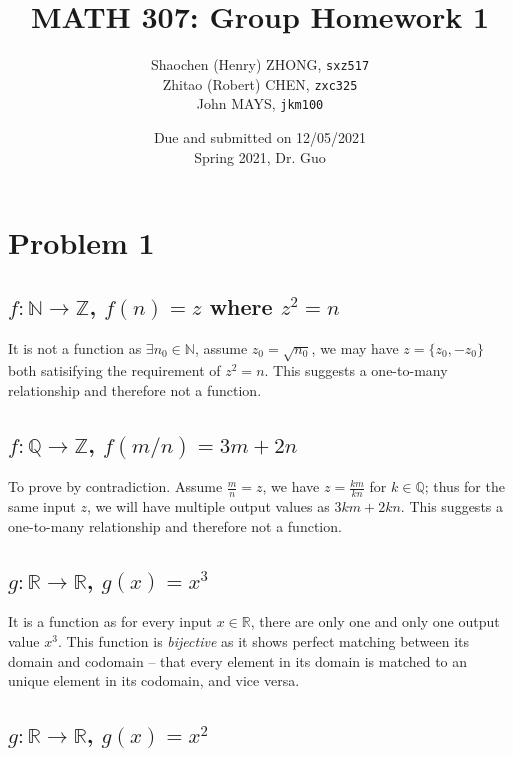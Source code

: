 \documentclass[11pt]{article}
\newcommand{\ilc}{\texttt}
\begin{document}
\title{\textbf{MATH 307: Group Homework 1}}


\author{Shaochen (Henry) ZHONG, \ilc{sxz517} \\
Zhitao (Robert) CHEN, \ilc{zxc325} \\
John MAYS, \ilc{jkm100}}
\date{Due and submitted on 12/05/2021 \\ Spring 2021, Dr. Guo}
\maketitle



\section*{Problem 1}

\subsection*{$f: \mathbb{N} \to \mathbb{Z}$, $f(n) = z$ where $z^2 = n$}

It is not a function as $\exists  n_0 \in \mathbb{N}$, assume $z_0 = \sqrt{n_0}$, we may have $z = \{z_0, -z_0\}$ both satisifying the requirement of $z^2 = n$. This suggests a one-to-many relationship and therefore not a function.


\subsection*{$f: \mathbb{Q} \to \mathbb{Z}$, $f(m/n) = 3m + 2n$}

To prove by contradiction. Assume $\frac{m}{n} = z$, we have $z = \frac{km}{kn}$ for $k \in \mathbb{Q}$; thus for the same input $z$, we will have multiple output values as $3km + 2kn$. This suggests a one-to-many relationship and therefore not a function.

\subsection*{$g: \mathbb{R} \to \mathbb{R}$, $g(x) = x^3$}

It is a function as for every input $x \in \mathbb{R}$, there are only one and only one output value $x^3$. This function is  \textit{bijective} as it shows perfect matching between its domain and codomain -- that every element in its domain is matched to an unique element in its codomain, and vice versa.

\subsection*{$g: \mathbb{R} \to \mathbb{R}$, $g(x) = x^2$}
\end{document}
